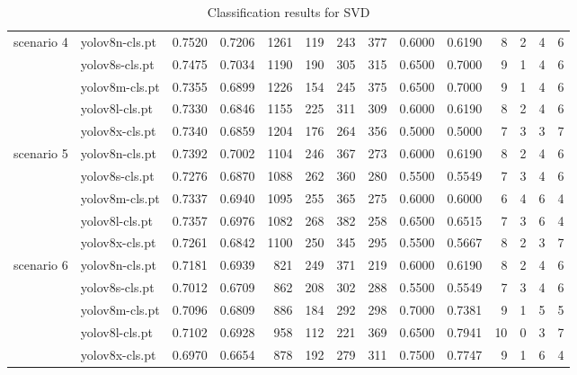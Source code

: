 \begin{table*}
\begin{tabular}{llrrrrrrrrrrrr}
			\midrule
			\multirow{5}{*}{scenario 4} & yolov8n-cls.pt & 0.7520 & 0.7206 & 1261 & 119 & 243 & 377 & 0.6000 & 0.6190 & 8 & 2 & 4 & 6 \\
			 & yolov8s-cls.pt & 0.7475 & 0.7034 & 1190 & 190 & 305 & 315 & 0.6500 & 0.7000 & 9 & 1 & 4 & 6 \\
			 & yolov8m-cls.pt & 0.7355 & 0.6899 & 1226 & 154 & 245 & 375 & 0.6500 & 0.7000 & 9 & 1 & 4 & 6 \\
			 & yolov8l-cls.pt & 0.7330 & 0.6846 & 1155 & 225 & 311 & 309 & 0.6000 & 0.6190 & 8 & 2 & 4 & 6 \\
			 & yolov8x-cls.pt & 0.7340 & 0.6859 & 1204 & 176 & 264 & 356 & 0.5000 & 0.5000 & 7 & 3 & 3 & 7 \\
			\midrule
			\multirow{5}{*}{scenario 5} & yolov8n-cls.pt & 0.7392 & 0.7002 & 1104 & 246 & 367 & 273 & 0.6000 & 0.6190 & 8 & 2 & 4 & 6 \\
			 & yolov8s-cls.pt & 0.7276 & 0.6870 & 1088 & 262 & 360 & 280 & 0.5500 & 0.5549 & 7 & 3 & 4 & 6 \\
			 & yolov8m-cls.pt & 0.7337 & 0.6940 & 1095 & 255 & 365 & 275 & 0.6000 & 0.6000 & 6 & 4 & 6 & 4 \\
			 & yolov8l-cls.pt & 0.7357 & 0.6976 & 1082 & 268 & 382 & 258 & 0.6500 & 0.6515 & 7 & 3 & 6 & 4 \\
			 & yolov8x-cls.pt & 0.7261 & 0.6842 & 1100 & 250 & 345 & 295 & 0.5500 & 0.5667 & 8 & 2 & 3 & 7 \\
			\midrule
			\multirow{5}{*}{scenario 6} & yolov8n-cls.pt & 0.7181 & 0.6939 & 821 & 249 & 371 & 219 & 0.6000 & 0.6190 & 8 & 2 & 4 & 6 \\
			 & yolov8s-cls.pt & 0.7012 & 0.6709 & 862 & 208 & 302 & 288 & 0.5500 & 0.5549 & 7 & 3 & 4 & 6 \\
			 & yolov8m-cls.pt & 0.7096 & 0.6809 & 886 & 184 & 292 & 298 & 0.7000 & 0.7381 & 9 & 1 & 5 & 5 \\
			 & yolov8l-cls.pt & 0.7102 & 0.6928 & 958 & 112 & 221 & 369 & 0.6500 & 0.7941 & 10 & 0 & 3 & 7 \\
			 & yolov8x-cls.pt & 0.6970 & 0.6654 & 878 & 192 & 279 & 311 & 0.7500 & 0.7747 & 9 & 1 & 6 & 4 \\
        \bottomrule
    \end{tabular}
    \caption{Classification results for SVD}
    \label{tab:svd_results}
\end{table*}